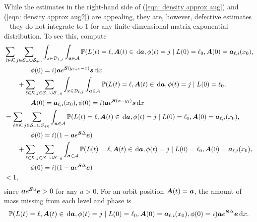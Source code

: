 While the estimates in the right-hand side of (\ref{eqn: density approx aug}) and (\ref{eqn: density approx aug2}) are appealing, they are, however, defective estimates -- they do not integrate to 1 for any finite-dimensional matrix exponential distribution. To see this, compute 
\begin{align*}
	&\sum_{\ell\in\mathcal K}\sum_{j\in\mathcal S_+\cup \mathcal{S}_{+0}}\int_{x\in\mathcal D_{\ell,j}}\displaystyle\int_{\boldsymbol a \in\mathcal A}\mathbb P(L(t) = \ell, \boldsymbol A(t)\in\, \mathrm{d} \boldsymbol a, \phi(t) = j\mid L(0)=\ell_0, \boldsymbol A(0) = \boldsymbol  a_{\ell,i}(x_0), 
	\\&\qquad{}\qquad{}\phi(0) = i) \boldsymbol a e^{ \boldsymbol{S}(y_{\ell+1}-x)} \boldsymbol s \, \mathrm{d} x
	\\&\qquad{}{}+\sum_{\ell\in\mathcal K}\sum_{j\in\mathcal S_-\cup \mathcal{S}_{-0}}\int_{x\in\mathcal D_{\ell,j}}\displaystyle\int_{\boldsymbol a \in\mathcal A}\mathbb P(L(t) = \ell, \boldsymbol A(t)\in\, \mathrm{d} \boldsymbol a, \phi(t) = j\mid L(0)=\ell_0, 
	\\&\qquad{}\qquad{}\boldsymbol A(0) = \boldsymbol  a_{\ell,i}(x_0), \phi(0) = i) \boldsymbol a e^{ \boldsymbol{S}(x-y_\ell)} \boldsymbol s \, \mathrm{d} x
	\\&= \sum_{\ell\in\mathcal K}\sum_{j\in\mathcal S_+\cup \mathcal{S}_{+0}}\displaystyle\int_{\boldsymbol a \in\mathcal A}\mathbb P(L(t) = \ell, \boldsymbol A(t)\in\, \mathrm{d} \boldsymbol a, \phi(t) = j\mid L(0)=\ell_0, \boldsymbol A(0) = \boldsymbol  a_{\ell,i}(x_0), 
	\\&\qquad{}\qquad{}\phi(0) = i) (1-\boldsymbol a e^{ \boldsymbol{S}\Delta}\boldsymbol e  )
	\\&\qquad{}{}+\sum_{\ell\in\mathcal K}\sum_{j\in\mathcal S_-\cup \mathcal{S}_{-0}}\displaystyle\int_{\boldsymbol a \in\mathcal A}\mathbb P(L(t) = \ell, \boldsymbol A(t)\in\, \mathrm{d} \boldsymbol a, \phi(t) = j\mid L(0)=\ell_0, \boldsymbol A(0) = \boldsymbol  a_{\ell,i}(x_0), 
	\\&\qquad{}\qquad{}\phi(0) = i) (1-\boldsymbol a e^{ \boldsymbol{S}\Delta} \boldsymbol e )
	\\&<1,
\end{align*}
since \(\boldsymbol a e^{\boldsymbol{S}u} \boldsymbol e>0\) for any \(u>0\). For an orbit position \(\boldsymbol A(t)=\boldsymbol a\), the amount of mass missing from each level and phase is 
\[\mathbb P(L(t) = \ell, \boldsymbol A(t)\in\, \mathrm{d} \boldsymbol a,\phi(t) = j\mid L(0)=\ell_0, \boldsymbol A(0) = \boldsymbol  a_{\ell,i}(x_0), \phi(0) = i) \boldsymbol a e^{\boldsymbol{S}\Delta} \boldsymbol e \, \mathrm{d} x.\]

